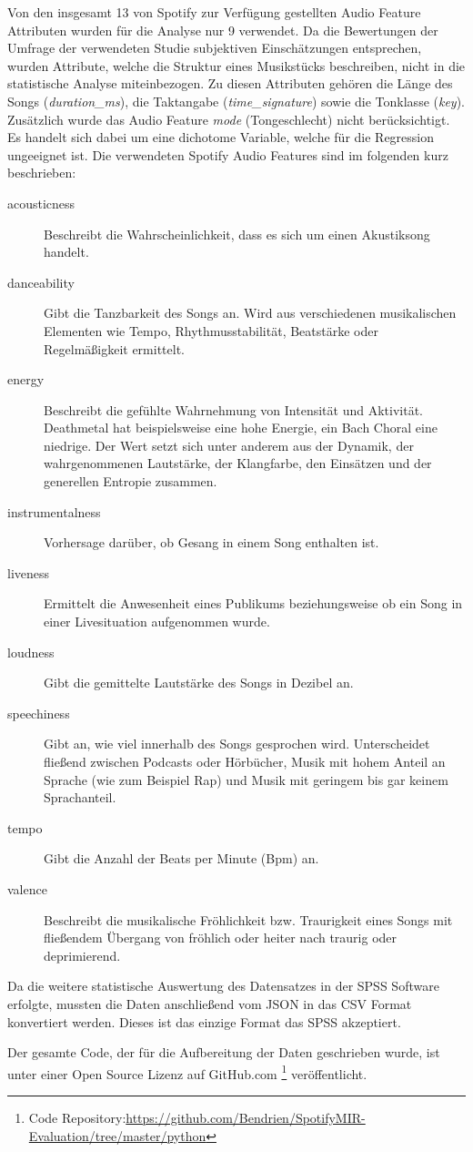Von den insgesamt 13 von Spotify zur Verfügung gestellten Audio Feature Attributen wurden für die Analyse nur 9 verwendet.
Da die Bewertungen der Umfrage der verwendeten Studie subjektiven Einschätzungen entsprechen, wurden Attribute, welche die Struktur eines Musikstücks beschreiben, nicht in die statistische Analyse miteinbezogen.
Zu diesen Attributen gehören die Länge des Songs (\textit{duration\_ms}), die Taktangabe (\textit{time\_signature}) sowie die Tonklasse (\textit{key}).
Zusätzlich wurde das Audio Feature \textit{mode} (Tongeschlecht) nicht berücksichtigt. Es handelt sich dabei um eine dichotome Variable, welche für die Regression ungeeignet ist.
Die verwendeten Spotify Audio Features sind im folgenden kurz beschrieben:

\begin{description}
    \item[acousticness]
        Beschreibt die Wahrscheinlichkeit, dass  es sich um einen Akustiksong handelt.
    \item[danceability]
        Gibt die Tanzbarkeit des Songs an.
        Wird aus verschiedenen musikalischen Elementen wie Tempo, Rhythmusstabilität, Beatstärke oder Regelmäßigkeit ermittelt.
    \item[energy]
        Beschreibt die gefühlte Wahrnehmung von Intensität und Aktivität.
        Deathmetal hat beispielsweise eine hohe Energie, ein Bach Choral eine niedrige. Der Wert setzt sich unter anderem aus der Dynamik, der wahrgenommenen Lautstärke, der Klangfarbe, den Einsätzen und der generellen Entropie zusammen.
    \item[instrumentalness]
        Vorhersage darüber, ob Gesang in einem Song enthalten ist.
    \item[liveness]
        Ermittelt die Anwesenheit eines Publikums beziehungsweise ob ein Song in einer Livesituation aufgenommen wurde.
    \item[loudness]
        Gibt die gemittelte Lautstärke des Songs in Dezibel an.
    \item[speechiness]
        Gibt an, wie viel innerhalb des Songs gesprochen wird.
        Unterscheidet fließend zwischen Podcasts oder Hörbücher, Musik mit hohem Anteil an Sprache (wie zum Beispiel Rap) und Musik mit geringem bis gar keinem Sprachanteil.
    \item[tempo]
        Gibt die Anzahl der Beats per Minute (Bpm) an.
    \item[valence]
        Beschreibt die musikalische Fröhlichkeit bzw. Traurigkeit eines Songs mit fließendem Übergang von fröhlich oder heiter 			nach traurig oder deprimierend.
\end{description}

Da die weitere statistische Auswertung des Datensatzes in der SPSS Software erfolgte, mussten die Daten anschließend vom JSON in das CSV Format konvertiert werden. Dieses ist das einzige Format das SPSS akzeptiert.

Der gesamte Code, der für die Aufbereitung der Daten geschrieben wurde, ist unter einer Open Source Lizenz auf GitHub.com \footnote{Code Repository:\hfill \url{https://github.com/Bendrien/SpotifyMIR-Evaluation/tree/master/python}} veröffentlicht.


